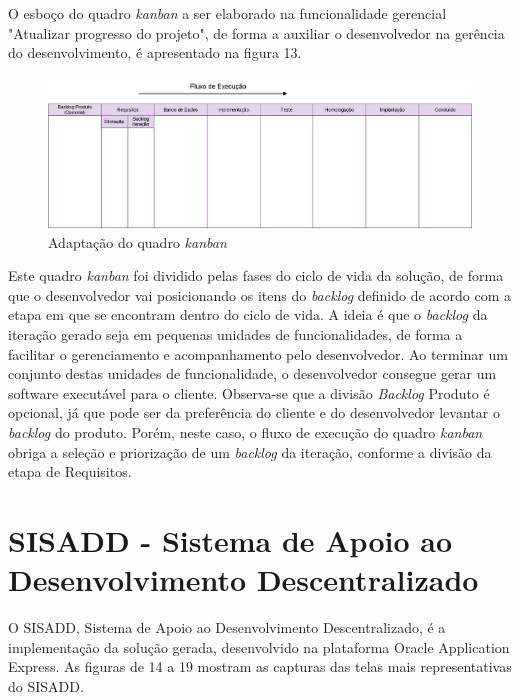 O esboço do quadro \textit{kanban} a ser elaborado na funcionalidade gerencial "Atualizar progresso do projeto", de forma a auxiliar o desenvolvedor na gerência do desenvolvimento, é apresentado na figura 13. \clearpage


\begin{landscape}
\vspace*{3cm}
\begin{figure}[!htb]
	\centering
		\includegraphics[scale=0.35]{figuras/kanban}
	\caption{Adaptação do quadro \textit{kanban}}
\end{figure}
\end{landscape}

Este quadro \textit{kanban} foi dividido pelas fases do ciclo de vida da solução, de forma que o desenvolvedor vai posicionando os itens do \textit{backlog} definido de acordo com a etapa em que se encontram dentro do ciclo de vida. A ideia é que o \textit{backlog} da iteração gerado seja em pequenas unidades de funcionalidades, de forma a facilitar o gerenciamento e acompanhamento pelo desenvolvedor. Ao terminar um conjunto destas unidades de funcionalidade, o desenvolvedor consegue gerar um software executável para o cliente. Observa-se que a divisão \textit{Backlog} Produto é opcional, já que pode ser da preferência do cliente e do desenvolvedor levantar o \textit{backlog} do produto. Porém, neste caso, o fluxo de execução do quadro \textit{kanban} obriga a seleção e priorização de um \textit{backlog} da iteração, conforme a divisão da etapa de Requisitos.

\section{SISADD - Sistema de Apoio ao Desenvolvimento Descentralizado}

O SISADD, Sistema de Apoio ao Desenvolvimento Descentralizado, é a implementação da solução gerada, desenvolvido na plataforma Oracle Application Express. As figuras de 14 a 19 mostram as capturas das telas mais representativas do SISADD.

